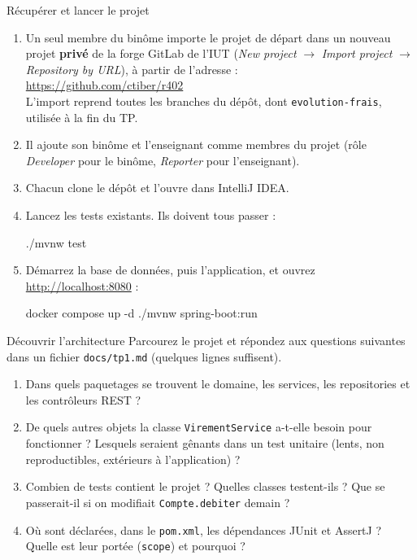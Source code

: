 \documentclass[11pt]{article}
\newcommand{\rstarterurl}{\url{https://github.com/ctiber/r402}}
\begin{document}
\begin{exobox}{Récupérer et lancer le projet}
\begin{enumerate}[leftmargin=1.4em]
  \item Un seul membre du binôme importe le projet de départ dans un nouveau projet \textbf{privé} de la forge GitLab de l'IUT (\textit{New project} $\rightarrow$ \textit{Import project} $\rightarrow$ \textit{Repository by URL}), à partir de l'adresse :\\ \rstarterurl\\
  L'import reprend toutes les branches du dépôt, dont \texttt{evolution-frais}, utilisée à la fin du TP.
  \item Il ajoute son binôme et l'enseignant comme membres du projet (rôle \textit{Developer} pour le binôme, \textit{Reporter} pour l'enseignant).
  \item Chacun clone le dépôt et l'ouvre dans IntelliJ IDEA.
  \item Lancez les tests existants. Ils doivent tous passer :
\begin{codebox}
./mvnw test
\end{codebox}
  \item Démarrez la base de données, puis l'application, et ouvrez \url{http://localhost:8080} :
\begin{codebox}
docker compose up -d
./mvnw spring-boot:run
\end{codebox}
\end{enumerate}
\end{exobox}

\begin{exobox}{Découvrir l'architecture}
Parcourez le projet et répondez aux questions suivantes dans un fichier \texttt{docs/tp1.md} (quelques lignes suffisent).
\begin{enumerate}[leftmargin=1.4em]
  \item Dans quels paquetages se trouvent le domaine, les services, les repositories et les contrôleurs REST ?
  \item De quels autres objets la classe \texttt{VirementService} a-t-elle besoin pour fonctionner ? Lesquels seraient gênants dans un test unitaire (lents, non reproductibles, extérieurs à l'application) ?
  \item Combien de tests contient le projet ? Quelles classes testent-ils ? Que se passerait-il si on modifiait \texttt{Compte.debiter} demain ?
  \item Où sont déclarées, dans le \texttt{pom.xml}, les dépendances JUnit et AssertJ ? Quelle est leur portée (\texttt{scope}) et pourquoi ?
\end{enumerate}
\end{exobox}
\end{document}
